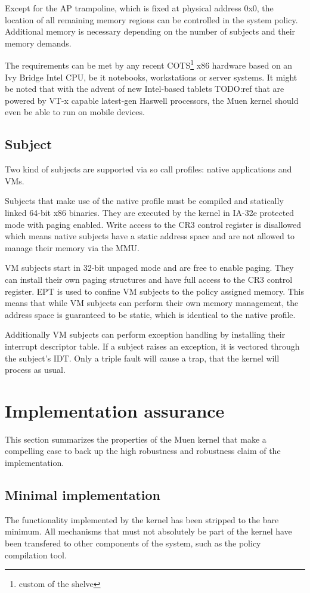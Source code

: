 Except for the AP trampoline, which is fixed at physical address 0x0, the
location of all remaining memory regions can be controlled in the system policy.
Additional memory is necessary depending on the number of subjects and their
memory demands.

The requirements can be met by any recent COTS\footnote{custom of the shelve}
x86 hardware based on an Ivy Bridge Intel CPU, be it notebooks, workstations or
server systems. It might be noted that with the advent of new Intel-based
tablets TODO:ref that are powered by VT-x capable latest-gen Haswell processors,
the Muen kernel should even be able to run on mobile devices.

\subsection{Subject}
Two kind of subjects are supported via so call profiles: native applications and
VMs.

Subjects that make use of the native profile must be compiled and statically
linked 64-bit x86 binaries. They are executed by the kernel in IA-32e protected
mode with paging enabled. Write access to the CR3 control register is disallowed
which means native subjects have a static address space and are not allowed to
manage their memory via the MMU.

VM subjects start in 32-bit unpaged mode and are free to enable paging. They can
install their own paging structures and have full access to the CR3 control
register. EPT is used to confine VM subjects to the policy assigned memory. This
means that while VM subjects can perform their own memory management, the
address space is guaranteed to be static, which is identical to the native
profile.

Additionally VM subjects can perform exception handling by installing their
interrupt descriptor table. If a subject raises an exception, it is vectored
through the subject's IDT. Only a triple fault will cause a trap, that the
kernel will process as usual.

\section{Implementation assurance}
This section summarizes the properties of the Muen kernel that make a compelling
case to back up the high robustness and robustness claim of the implementation.

\subsection{Minimal implementation}
The functionality implemented by the kernel has been stripped to the bare
minimum. All mechanisms that must not absolutely be part of the kernel have been
transfered to other components of the system, such as the policy compilation
tool.

